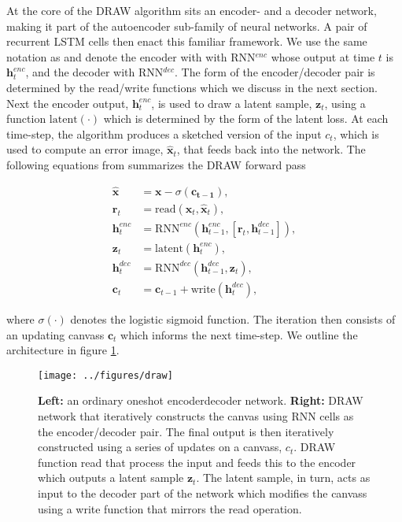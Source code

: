 \noindent At the core of the DRAW algorithm sits an encoder- and a decoder network, making it part of the autoencoder sub-family of neural networks. A pair of recurrent LSTM cells then enact this familiar framework. We use the same notation as \citet{Gregor2015} and denote the encoder with with RNN${}^{enc}$ whose output at time $t$ is $\boldsymbol{h}_t^{enc}$, and the decoder with RNN${}^{dec}$. The form of the encoder/decoder pair is determined by the read/write functions which we discuss in the next section. Next the encoder output, $\boldsymbol{h}_t^{enc}$, is used to draw a latent sample, $\boldsymbol{z}_t$, using a function $\text{latent}(\cdot)$ which is determined by the form of the latent loss. At each time-step, the algorithm produces a sketched version of the input $c_t$, which is used to compute an error image, $\hat{\boldsymbol{x}}_t$, that feeds back into the network. The following equations from \citet{Gregor2015} summarizes the DRAW forward pass

\begin{align}
\hat{\boldsymbol{x}} &= \boldsymbol{x} - \sigma(\boldsymbol{c_{t-1}}), \\
\boldsymbol{r}_t &= \text{read}(\boldsymbol{x}_t, \hat{\boldsymbol{x}}_t ), \\
\boldsymbol{h}^{enc}_t &= \text{RNN}^{enc}( \boldsymbol{h}^{enc}_{t-1}, [\boldsymbol{r}_t, \boldsymbol{h}^{dec}_{t-1}]),\\
\boldsymbol{z}_t &= \text{latent}(\boldsymbol{h}^{enc}_t),\\
\boldsymbol{h}^{dec}_t &= \text{RNN}^{dec}( \boldsymbol{h}^{dec}_{t-1}, \boldsymbol{z}_t),\\
\boldsymbol{c}_t &= \boldsymbol{c}_{t-1} + \text{write}(\boldsymbol{h}_t^{dec}) \label{eq:draw},
\end{align} 

 \noindent where $\sigma(\cdot)$ denotes the logistic sigmoid function. The iteration then consists of an updating canvass $\boldsymbol{c}_t$ which informs the next time-step. We outline the architecture in figure \ref{fig:draw}.

\begin{figure}[h]
\centering
\texttt{[image: ../figures/draw]}
\caption[DRAW network architecture]{\textbf{Left:} an ordinary one\-shot encoder\-decoder network. \textbf{Right:} DRAW network that iteratively constructs the canvas using RNN cells as the encoder/decoder pair. The final output is then iteratively constructed using a series of updates on a canvass, $c_t$. DRAW function read that process the input and feeds this to the encoder which outputs a latent sample $\boldsymbol{z}_t$. The latent sample, in turn, acts as input to the decoder part of the network which modifies the canvass using a write function that mirrors the read operation.}\label{fig:draw}
\end{figure}
 
